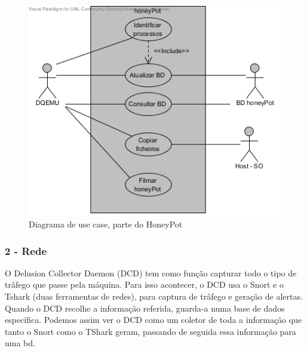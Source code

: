 \begin{figure}[!htb]
	\centering
	\includegraphics[scale=0.80]{images/ucs/HoneyPot}
	\caption {Diagrama de use case, parte do HoneyPot}
\end{figure}
\pagebreak




\subsubsection{\textbf{2 - Rede}}

O Delusion Collector Daemon (DCD) tem como função capturar todo o tipo de trâfego que passe pela máquina. Para isso acontecer, o DCD usa o Snort e o
Tshark (duas ferramentas de redes), para captura de trâfego e geração de alertas. Quando o DCD recolhe a informação referida, guarda-a numa 
base de dados específica. Podemos assim ver o DCD como um coletor de toda a informação que tanto o Snort como o TShark geram, passando de seguida
essa informação para uma bd.


